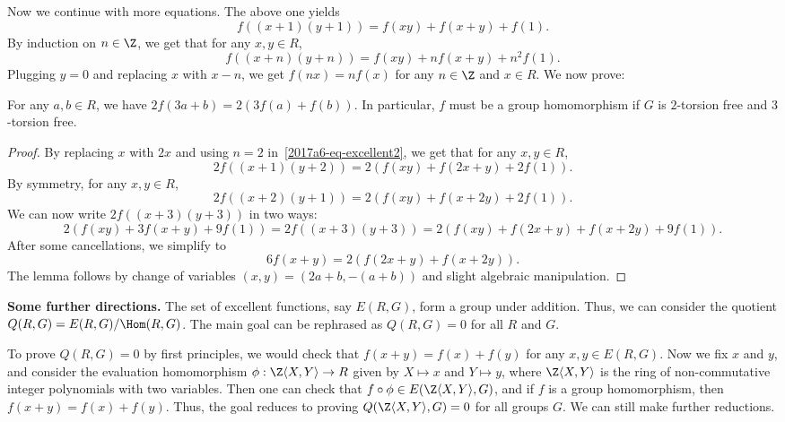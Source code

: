 Now we continue with more equations.
The above one yields
\[ f((x + 1)(y + 1)) = f(xy) + f(x + y) + f(1). \]
By induction on $n \in \Z$, we get that for any $x, y \in R$,
\[ f((x + n)(y + n)) = f(xy) + n f(x + y) + n^2 f(1). \tag{3.2}\label{2017a6-eq-excellent2} \]
Plugging $y = 0$ and replacing $x$ with $x - n$, we get $f(nx) = n f(x)$ for any $n \in \Z$ and $x \in R$.
We now prove:

\begin{lemma}\label{2017a6-excellent-main}
For any $a, b \in R$, we have $2 f(3a + b) = 2 (3 f(a) + f(b))$.
In particular, $f$ must be a group homomorphism if $G$ is $2$-torsion free and $3$-torsion free.
\end{lemma}
\begin{proof}
By replacing $x$ with $2x$ and using $n = 2$ in~\eqref{2017a6-eq-excellent2}, we get that for any $x, y \in R$,
\[ 2 f((x + 1)(y + 2)) = 2 (f(xy) + f(2x + y) + 2 f(1)). \]
By symmetry, for any $x, y \in R$,
\[ 2 f((x + 2)(y + 1)) = 2 (f(xy) + f(x + 2y) + 2 f(1)). \]
We can now write $2 f((x + 3)(y + 3))$ in two ways:
\[ 2(f(xy) + 3 f(x + y) + 9 f(1)) = 2 f((x + 3)(y + 3)) = 2 (f(xy) + f(2x + y) + f(x + 2y) + 9 f(1)). \]
After some cancellations, we simplify to
\[ 6 f(x + y) = 2 (f(2x + y) + f(x + 2y)). \]
The lemma follows by change of variables $(x, y) = (2a + b, -(a + b))$ and slight algebraic manipulation.
\end{proof}



\textbf{Some further directions.}
The set of excellent functions, say $E(R, G)$, form a group under addition.
Thus, we can consider the quotient $Q(R, G) = E(R, G)/\Hom(R, G)$.
The main goal can be rephrased as $Q(R, G) = 0$ for all $R$ and $G$.

To prove $Q(R, G) = 0$ by first principles, we would check that $f(x + y) = f(x) + f(y)$ for any $x, y \in E(R, G)$.
Now we fix $x$ and $y$, and consider the evaluation homomorphism $\phi : \Z \langle X, Y \rangle \to R$ given by $X \mapsto x$ and $Y \mapsto y$, where $\Z \langle X, Y \rangle$ is the ring of non-commutative integer polynomials with two variables.
Then one can check that $f \circ \phi \in E(\Z \langle X, Y \rangle, G)$, and if $f$ is a group homomorphism, then $f(x + y) = f(x) + f(y)$.
Thus, the goal reduces to proving $Q(\Z \langle X, Y \rangle, G) = 0$ for all groups $G$.
We can still make further reductions.


